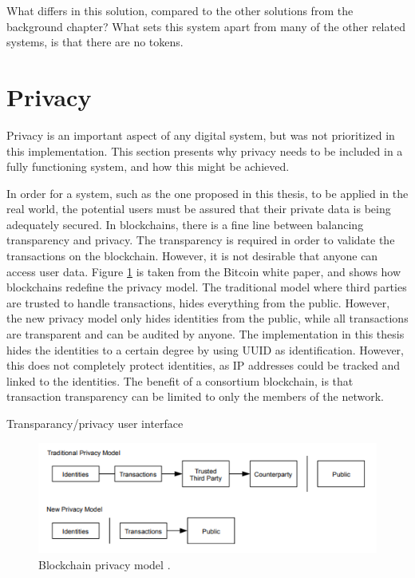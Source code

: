 What differs in this solution, compared to the other solutions from the background chapter?
What sets this system apart from many of the other related systems, is that there are no tokens.

\section{Privacy}
Privacy is an important aspect of any digital system, but was not prioritized in this implementation. This section presents why privacy needs to be included in a fully functioning system, and how this might be achieved. 

In order for a system, such as the one proposed in this thesis, to be applied in the real world, the potential users must be assured that their private data is being adequately secured. In blockchains, there is a fine line between balancing transparency and privacy. The transparency is required in order to validate the transactions on the blockchain. However, it is not desirable that anyone can access user data. Figure \ref{privacy} is taken from the Bitcoin white paper, and shows how blockchains redefine the privacy model. The traditional model where third parties are trusted to handle transactions, hides everything from the public. However, the new privacy model only hides identities from the public, while all transactions are transparent and can be audited by anyone. The implementation in this thesis hides the identities to a certain degree by using UUID as identification. However, this does not completely protect identities, as IP addresses could be tracked and linked to the identities. The benefit of a consortium blockchain, is that transaction transparency can be limited to only the members of the network.

Transparancy/privacy user interface

\begin{figure}[!htb]
\centering
	\includegraphics[width=1\textwidth]{Images/privacy}
	\caption{Blockchain privacy model \cite{Nakamoto_bitcoin}.}
	\label{privacy}
\end{figure}

